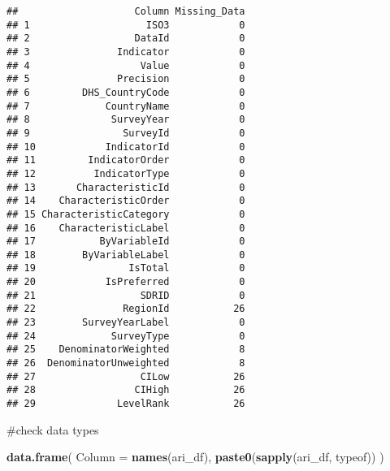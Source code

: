 \documentclass[
]{article}
\newenvironment{Shaded}{\begin{snugshade}}{\end{snugshade}}
\newcommand{\AttributeTok}[1]{\textcolor[rgb]{0.13,0.29,0.53}{#1}}
\newcommand{\FunctionTok}[1]{\textcolor[rgb]{0.13,0.29,0.53}{\textbf{#1}}}
\newcommand{\NormalTok}[1]{#1}
\begin{document}
\begin{verbatim}
##                    Column Missing_Data
## 1                    ISO3            0
## 2                  DataId            0
## 3               Indicator            0
## 4                   Value            0
## 5               Precision            0
## 6         DHS_CountryCode            0
## 7             CountryName            0
## 8              SurveyYear            0
## 9                SurveyId            0
## 10            IndicatorId            0
## 11         IndicatorOrder            0
## 12          IndicatorType            0
## 13       CharacteristicId            0
## 14    CharacteristicOrder            0
## 15 CharacteristicCategory            0
## 16    CharacteristicLabel            0
## 17           ByVariableId            0
## 18        ByVariableLabel            0
## 19                IsTotal            0
## 20            IsPreferred            0
## 21                  SDRID            0
## 22               RegionId           26
## 23        SurveyYearLabel            0
## 24             SurveyType            0
## 25    DenominatorWeighted            8
## 26  DenominatorUnweighted            8
## 27                  CILow           26
## 28                 CIHigh           26
## 29              LevelRank           26
\end{verbatim}

\#check data types

\begin{Shaded}
\begin{Highlighting}[]
\FunctionTok{data.frame}\NormalTok{(}
  \AttributeTok{Column =} \FunctionTok{names}\NormalTok{(ari\_df),}
  \FunctionTok{paste0}\NormalTok{(}\FunctionTok{sapply}\NormalTok{(ari\_df, typeof))}
\NormalTok{)}
\end{Highlighting}
\end{Shaded}
\end{document}
